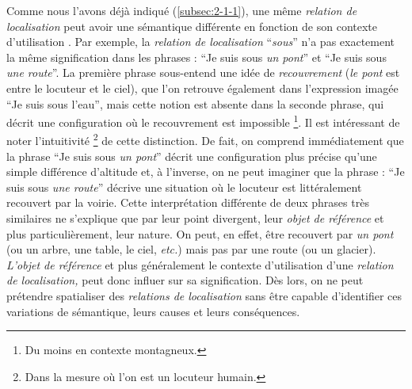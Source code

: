 Comme nous l'avons déjà indiqué (\autoref{subsec:2-1-1}), une même
\emph{relation de localisation} peut avoir une sémantique différente
en fonction de son contexte d'utilisation
\autocite[16]{Borillo1998}. Par exemple, la \emph{relation de
  localisation} \enquote{\emph{sous}} n'a pas exactement la même
signification dans les phrases : \enquote{Je suis sous \emph{un pont}}
et \enquote{Je suis sous \emph{une route}}. La première phrase
sous-entend une idée de \emph{recouvrement} (\ie \emph{le pont} est
entre le locuteur et le ciel), que l'on retrouve également dans
l'expression imagée \enquote{Je suis sous l'eau}, mais cette notion
est absente dans la seconde phrase, qui décrit une configuration où le
recouvrement est impossible \footnote{Du moins en contexte
  montagneux.}. Il est intéressant de noter l'intuitivité
\footnote{Dans la mesure où l'on est un locuteur humain.} de cette
distinction. De fait, on comprend immédiatement que la phrase
\enquote{Je suis sous \emph{un pont}} décrit une configuration plus
précise qu'une simple différence d'altitude et, à l'inverse, on ne
peut imaginer que la phrase : \enquote{Je suis sous \emph{une route}}
décrive une situation où le locuteur est littéralement recouvert par
la voirie. Cette interprétation différente de deux phrases très
similaires ne s'explique que par leur point divergent, leur
\emph{objet de référence} et plus particulièrement, leur nature. On
peut, en effet, être recouvert par \emph{un pont} (ou un arbre, une
table, le ciel, \emph{etc.}) mais pas par une route (ou un
glacier). \emph{L'objet de référence} et plus généralement le contexte
d'utilisation d'une \emph{relation de localisation,} peut donc influer
sur sa signification. Dès lors, on ne peut prétendre spatialiser des
\emph{relations de localisation} sans être capable d'identifier ces
variations de sémantique, leurs causes et leurs conséquences.

